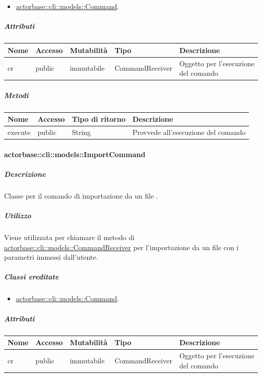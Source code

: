 \documentclass{scalatekids-article}
\begin{document}
\begin{itemize}
\item \hyperref[sec:actorbase::cli::models::Command]{actorbase::cli::models::Command}.
\end{itemize}

\subparagraph{Attributi}

\begin{tabular}{| p{1cm} | p{1.5cm} | p{2cm} | p{4cm} | p{8.5cm} |}
  \hline
  Nome & Accesso & Mutabilità & Tipo & Descrizione\\
  \hline
  cr & public & immutabile & CommandReceiver & Oggetto per l'esecuzione del comando\\
  \hline
\end{tabular}

\subparagraph{Metodi}

\begin{tabular}{| l | l | l | l |}
  \hline
  Nome & Accesso & Tipo di ritorno & Descrizione\\
  \hline
  execute & public & String & Provvede all'esecuzione del comando\\
  \hline
\end{tabular}

\paragraph{actorbase::cli::models::ImportCommand}
\label{sec:actorbase::cli::models::ImportCommand}

\subparagraph{Descrizione}

Classe per il comando di importazione da un file .

\subparagraph{Utilizzo}

Viene utilizzata per chiamare il metodo di
\hyperref[sec:actorbase::cli::models::CommandReceiver]{actorbase::cli::models::CommandReceiver} per l'importazione da un file
 con i parametri immessi dall'utente.

\subparagraph{Classi ereditate}

\begin{itemize}
\item \hyperref[sec:actorbase::cli::models::Command]{actorbase::cli::models::Command}.
\end{itemize}

\subparagraph{Attributi}
\begin{tabular}{| p{1cm} | p{1.5cm} | p{2cm} | p{4cm} | p{8.5cm} |}
  \hline
  Nome & Accesso & Mutabilità & Tipo & Descrizione\\
  \hline
  cr & public & immutabile & CommandReceiver & Oggetto per l'esecuzione del comando\\
  \hline
\end{tabular}
\end{document}
